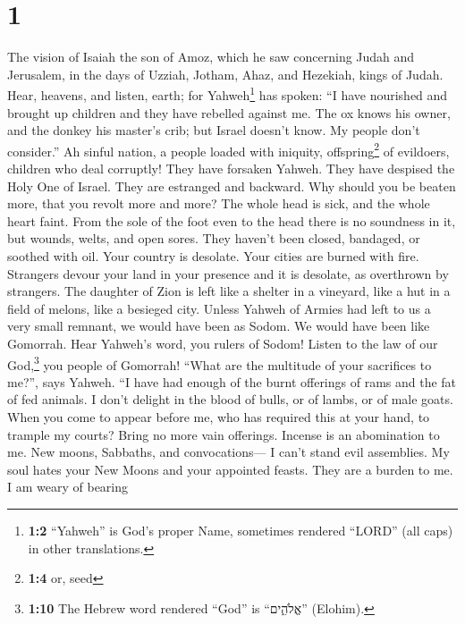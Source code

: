 \hypertarget{section}{%
\section{1}\label{section}}

 The vision of Isaiah the son of Amoz, which he saw
concerning Judah and Jerusalem, in the days of Uzziah, Jotham, Ahaz, and
Hezekiah, kings of Judah.  Hear, heavens, and listen,
earth; for Yahweh\footnote{\textbf{1:2} ``Yahweh'' is God's proper Name,
  sometimes rendered ``LORD'' (all caps) in other translations.} has
spoken: ``I have nourished and brought up children and they have
rebelled against me.  The ox knows his owner, and the
donkey his master's crib; but Israel doesn't know. My people don't
consider.''  Ah sinful nation, a people loaded with
iniquity, offspring\footnote{\textbf{1:4} or, seed} of evildoers,
children who deal corruptly! They have forsaken Yahweh. They have
despised the Holy One of Israel. They are estranged and backward.
 Why should you be beaten more, that you revolt more and
more? The whole head is sick, and the whole heart faint. 
From the sole of the foot even to the head there is no soundness in it,
but wounds, welts, and open sores. They haven't been closed, bandaged,
or soothed with oil.  Your country is desolate. Your
cities are burned with fire. Strangers devour your land in your presence
and it is desolate, as overthrown by strangers.  The
daughter of Zion is left like a shelter in a vineyard, like a hut in a
field of melons, like a besieged city.  Unless Yahweh of
Armies had left to us a very small remnant, we would have been as Sodom.
We would have been like Gomorrah.  Hear Yahweh's word,
you rulers of Sodom! Listen to the law of our God,\footnote{\textbf{1:10}
  The Hebrew word rendered ``God'' is ``אֱלֹהִ֑ים'' (Elohim).} you
people of Gomorrah!  ``What are the multitude of your
sacrifices to me?'', says Yahweh. ``I have had enough of the burnt
offerings of rams and the fat of fed animals. I don't delight in the
blood of bulls, or of lambs, or of male goats.  When you
come to appear before me, who has required this at your hand, to trample
my courts?  Bring no more vain offerings. Incense is an
abomination to me. New moons, Sabbaths, and convocations--- I can't
stand evil assemblies.  My soul hates your New Moons and
your appointed feasts. They are a burden to me. I am weary of bearing
